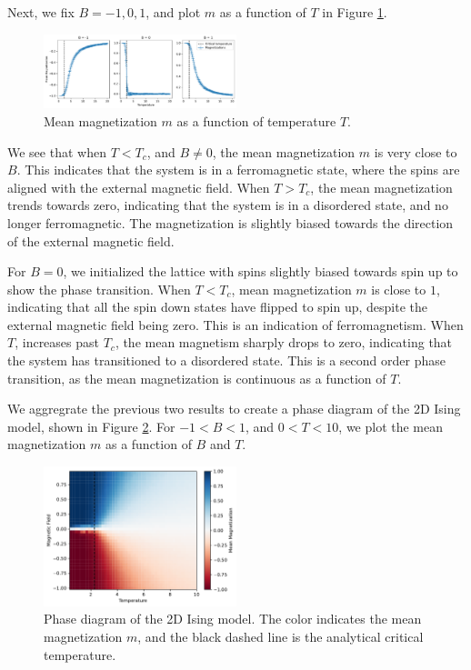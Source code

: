 \documentclass[
 reprint,
 amsmath,
 amssymb,
 aps,
]{revtex4-2}
\begin{document}
Next, we fix $ B = -1, 0, 1 $, and plot $ m $ as a function of $ T $
in Figure \ref{fig:m_vs_T}.
\begin{figure}[ht]
\centering
\includegraphics[width=0.5\textwidth]{figures/m_vs_T.pdf}
\caption{Mean magnetization $ m $ as a function of temperature $ T $.}
\label{fig:m_vs_T}
\end{figure}
We see that when $ T < T_{c} $,
and $ B\neq 0 $,
the mean magnetization $ m $ is very close to $ B $.
This indicates that the system is in a ferromagnetic state,
where the spins are aligned with the external magnetic field.
When $ T > T_{c} $,
the mean magnetization trends towards zero,
indicating that the system is in a disordered state,
and no longer ferromagnetic.
The magnetization is slightly biased towards the direction of the external
magnetic field.

For $ B = 0 $, we initialized the lattice with spins slightly biased towards
spin up to show the phase transition.
When $ T < T_{c} $,
mean magnetization $ m $ is close to $ 1 $,
indicating that all the spin down states have flipped to spin up,
despite the external magnetic field being zero.
This is an indication of ferromagnetism.
When $ T $, increases past $ T_{c} $,
the mean magnetism sharply drops to zero,
indicating that the system has transitioned to a disordered state.
This is a second order phase transition, as the mean magnetization
is continuous as a function of $ T $.

We aggregrate the previous two results to create a phase diagram of the 
2D Ising model, shown in Figure \ref{fig:phase}.
For $ -1 < B < 1 $, and $ 0 < T < 10 $,
we plot the mean magnetization $ m $ as a function of $ B $ and $ T $.

\begin{figure}[ht]
\centering
\includegraphics[width=0.5\textwidth]{figures/phase.pdf}
\caption{Phase diagram of the 2D Ising model.
The color indicates the mean magnetization $ m $, 
and the black dashed line is the analytical critical temperature.}
\label{fig:phase}
\end{figure}
\end{document}

